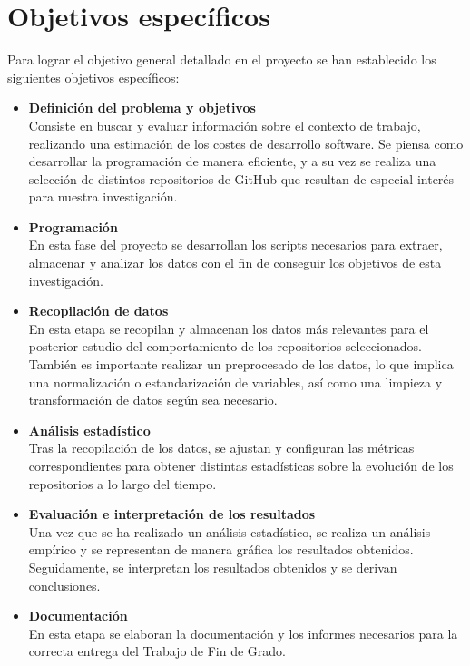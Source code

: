 \documentclass[a4paper, 12pt]{book}
\begin{document}
\section{Objetivos específicos}
\label{sec:objetivos-especificos}

Para lograr el objetivo general detallado en el proyecto se han establecido los siguientes objetivos específicos:
\begin{itemize}
  
  \item \textbf{Definición del problema y objetivos}
  \\Consiste en buscar y evaluar información sobre el contexto de trabajo, realizando una estimación de los
  costes de desarrollo software. Se piensa como desarrollar la programación de manera eficiente, y a su vez se realiza una selección de distintos
  repositorios de GitHub que resultan de especial interés para nuestra investigación.

  \item \textbf{Programación}
  \\En esta fase del proyecto se desarrollan los scripts necesarios para extraer, almacenar y analizar los datos con
  el fin de conseguir los objetivos de esta investigación.
  
  \item \textbf{Recopilación de datos}
  \\En esta etapa se recopilan y almacenan los datos más relevantes para el posterior estudio del comportamiento
  de los repositorios seleccionados. También es importante realizar un preprocesado de los datos, lo que implica una
  normalización o estandarización de variables, así como una limpieza y transformación de datos según sea necesario.
  
  \item \textbf{Análisis estadístico}
  \\Tras la recopilación de los datos, se ajustan y configuran las métricas correspondientes para obtener
  distintas estadísticas sobre la evolución de los repositorios a lo largo del tiempo.

  \item \textbf{Evaluación e interpretación de los resultados}
  \\Una vez que se ha realizado un análisis estadístico, se realiza un análisis empírico y se representan 
  de manera gráfica los resultados obtenidos. Seguidamente, se interpretan los resultados obtenidos y se
  derivan conclusiones.
 
  \item \textbf{Documentación}
  \\En esta etapa se elaboran la documentación y los informes necesarios para la correcta entrega del Trabajo de Fin de Grado.

\end{itemize}
\end{document}
